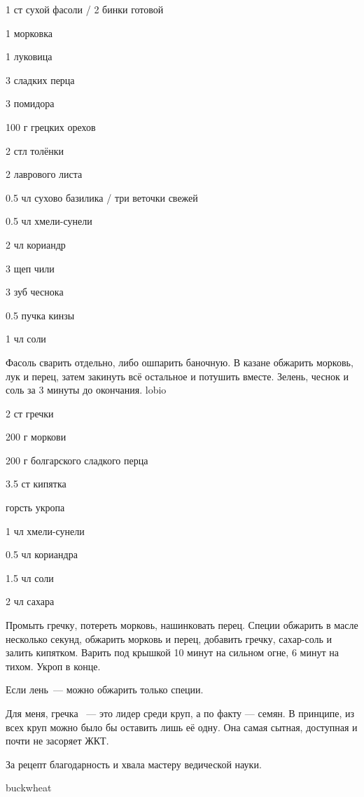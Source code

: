 


{
\item 1 ст сухой  фасоли / 2 бинки готовой
\item 1 морковка 
\item 1 луковица
\item 3 сладких перца
\item 3 помидора
\item 100 г грецких орехов 
\item 2 стл толёнки 
}{
\item 2 лаврового листа
\item 0.5 чл сухово базилика / три веточки свежей
\item 0.5 чл хмели-сунели
\item 2 чл кориандр
\item 3 щеп чили 
\item 3 зуб чеснока 
\item 0.5 пучка кинзы
\item 1 чл соли
}{
Фасоль сварить отдельно, либо ошпарить баночную. В казане обжарить морковь, лук и перец, затем закинуть всё остальное и потушить вместе. Зелень, чеснок и соль за 3 минуты до окончания.
}{}{lobio}

{
\item 2 ст гречки
\item 200 г моркови
\item 200 г болгарского сладкого перца
\item 3.5 ст кипятка
\item горсть укропа
}{
\item 1 чл хмели-сунели
\item 0.5 чл кориандра
\item 1.5 чл соли
\item 2 чл сахара
}{
Промыть гречку, потереть морковь, нашинковать перец. Специи обжарить в масле несколько секунд, обжарить морковь и перец, добавить гречку, сахар-соль и залить кипятком. Варить под крышкой 10 минут на сильном огне, 6 минут на тихом. Укроп в конце.
}{
\begin{advice}
\item Если лень~--- можно обжарить только специи.
\item Для меня, гречка ~--- это лидер среди круп, а по факту — семян. В принципе, из всех круп можно было бы оставить лишь её одну. Она самая сытная, доступная и почти не засоряет ЖКТ. 
\item За рецепт благодарность и хвала мастеру ведической науки. 
\end{advice}}{buckwheat}



